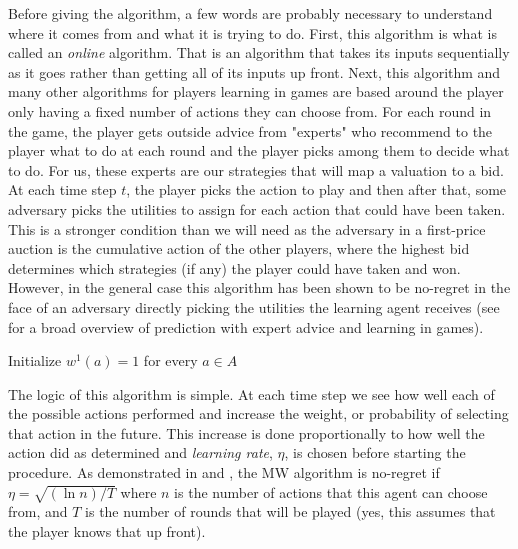 \documentclass[12pt,twoside]{reedthesis}
\begin{document}
Before giving the algorithm, a few words are probably necessary to understand where it comes from and what it is trying to do. First, this algorithm is what is called an {\em online} algorithm. That is an algorithm that takes its inputs sequentially as it goes rather than getting all of its inputs up front. Next, this algorithm and many other algorithms for players learning in games are based around the player only having a fixed number of actions they can choose from. For each round in the game, the player gets outside advice from "experts" who recommend to the player what to do at each round and the player picks among them to decide what to do. For us, these experts are our strategies that will map a valuation to a bid. At each time step $t$, the player picks the action to play and then after that, some adversary picks the utilities to assign for each action that could have been taken. This is a stronger condition than we will need as the adversary in a first-price auction is the cumulative action of the other players, where the highest bid determines which strategies (if any) the player could have taken and won. However, in the general case this algorithm has been shown to be no-regret in the face of an adversary directly picking the utilities the learning agent receives (see \cite{Lugosi2006} for a broad overview of prediction with expert advice and learning in games).\\

\begin{algorithm}[H]
	Initialize $w^1(a) = 1$ for every $a\in A$\\
\end{algorithm}
\vspace{1cm}
The logic of this algorithm is simple. At each time step we see how well each of the possible actions performed and increase the weight, or probability of selecting that action in the future. This increase is done proportionally to how well the action did as determined and \textit{learning rate}, $\eta$, is chosen before starting the procedure. As demonstrated in \cite{Roughgarden2016} and \cite{Blum2007}, the MW algorithm is no-regret if $\eta = \sqrt{(\ln n) / T}$ where $n$ is the number of actions that this agent can choose from, and $T$ is the number of rounds that will be played (yes, this assumes that the player knows that up front).
\end{document}
